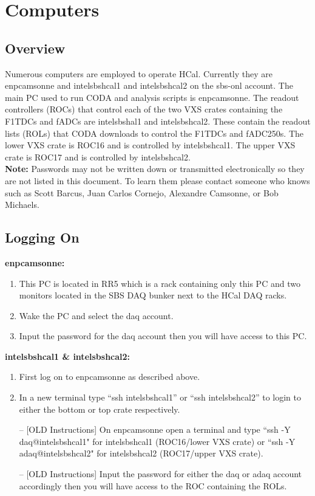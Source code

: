 \documentclass[oneside]{book}   %
\begin{document}
\chapter{Computers}
\label{ch:computers}
\section{Overview}
\label{sec:computers_overview}

Numerous computers are employed to operate HCal. Currently they are enpcamsonne and intelsbshcal1 and intelsbshcal2 on the sbs-onl account. The main PC used to run CODA and analysis scripts is enpcamsonne. The readout controllers (ROCs) that control each of the two VXS crates containing the F1TDCs and fADCs are intelsbshal1 and intelsbshcal2. These contain the readout lists (ROLs) that CODA downloads to control the F1TDCs and fADC250s. The lower VXS crate is ROC16 and is controlled by intelsbshcal1. The upper VXS crate is ROC17 and is controlled by intelsbshcal2.\\

\textbf{\large{Note:}} 
Passwords may not be written down or transmitted electronically so they are not listed in this document. To learn them please contact someone who knows such as Scott Barcus, Juan Carlos Cornejo, Alexandre Camsonne, or Bob Michaels.

\section{Logging On}
\label{sec:logging_on}

\textbf{\large{enpcamsonne:}}
\begin{enumerate}
	\item This PC is located in RR5 which is a rack containing only this PC and two monitors located in the SBS DAQ bunker next to the HCal DAQ racks.
	\item Wake the PC and select the daq account.
	\item Input the password for the daq account then you will have access to this PC.
\end{enumerate}

\textbf{\large{intelsbshcal1 \& intelsbshcal2:}}
\begin{enumerate}
	\item First log on to enpcamsonne as described above.
	\item In a new terminal type ``ssh intelsbshcal1'' or ``ssh intelsbshcal2'' to login to either the bottom or top crate respectively.
	\item[--] [OLD Instructions] On enpcamsonne open a terminal and type ``ssh -Y daq@intelsbshcal1" for intelsbshcal1 (ROC16/lower VXS crate) or ``ssh -Y adaq@intelsbshcal2" for intelsbshcal2 (ROC17/upper VXS crate).
	\item[--] [OLD Instructions] Input the password for either the daq or adaq account accordingly then you will have access to the ROC containing the ROLs.
\end{enumerate}
\end{document}
